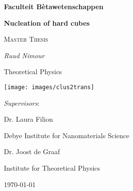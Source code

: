 \documentclass[thesis]{subfiles}
\begin{document}
\begin{titlepage}
    \begin{flushright}
    {\LARGE\bfseries Faculteit B\`etawetenschappen \par} %
    \end{flushright}
	\vspace{1cm}
    \begin{center}
    {\huge\bfseries Nucleation of hard cubes \par} %
    \end{center}
	\vspace{1cm}
    {\scshape\Large Master Thesis\par}
	\vspace{0.75cm} %
	{\Large\itshape Ruud Nimour\par} %
    \vspace{0.5cm}
    {\Large Theoretical Physics}\par %
    \vspace{-3cm}
    \centering
    \texttt{[image: images/clus2trans]}%
    \vspace{-1cm}
    \par
    \raggedleft
	{\Large\itshape Supervisors}:\par\vspace{0.25cm}
	{\large Dr. Laura Filion\par} %
    Debye Institute for Nanomaterials Science\par %
    \vspace{0.25cm}
    {\large Dr. Joost de Graaf\par} %
    Institute for Theoretical Physics %

	\vfill
	{\large \today\par}%
    
\end{titlepage}    

\restoregeometry %
\end{document}
